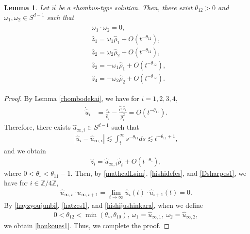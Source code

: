 \documentclass[reqno]{amsart}
\theoremstyle{plain}
\newtheorem{lemma}[theorem]{Lemma}
\theoremstyle{definition}
\numberwithin{equation}{section}
\begin{document}
\begin{lemma}\label{houkourhombus}
Let $\vec{u}$ be a rhombus-type solution. Then, there exist $\theta_{12}>0$ and  $\omega_1,\omega_2\in S^{d-1}$ such that 
\begin{align}\label{houkoues1}
\begin{aligned}
&\omega_1\cdot \omega_2=0,
\\
&\hat{z}_1=\omega_1\hat{\rho}_1+O\left(t^{-\theta_{12}}\right),
\\
&\hat{z}_2=\omega_2\hat{\rho}_2+O\left(t^{-\theta_{12}}\right),
\\
&\hat{z}_3=-\omega_1\hat{\rho}_1+O\left(t^{-\theta_{12}}\right),
\\
&\hat{z}_4=-\omega_2\hat{\rho}_2+O\left(t^{-\theta_{12}}\right).
\end{aligned}
\end{align}
\end{lemma}


\begin{proof}
By Lemma \ref{rhombodekai}, we have for $i=1,2,3,4$,
\begin{align*}
\dot{\hat{u}}_i&=\frac{\dot{\hat{z}}_i}{\hat{\rho}_i}-\frac{\dot{\hat{\rho}}_i\hat{z}_i}{\hat{\rho}_i^2}=O\left(t^{-\theta_{11}}\right).
\end{align*}
Therefore, there exists $\hat{u}_{\infty,i}\in S^{d-1}$ such that
\begin{align*}
\left|\hat{u}_i-\hat{u}_{\infty,i}\right|\lesssim  \int_t^{\infty}s^{-\theta_{11}}ds\lesssim t^{-\theta_{11}+1},
\end{align*}
and we obtain
\begin{align}\label{hatzes1}
\hat{z}_i=\hat{u}_{\infty,i}\hat{\rho}_i+O\left(t^{-\theta_{\circ}}\right),
\end{align}
where $0<\theta_{\circ}<\theta_{11}-1$. Then, by \eqref{mathcalLsim}, \eqref{hishidefes}, and \eqref{Dsharpes1}, we have for $i\in\mathbb{Z}/4\mathbb{Z}$, 
\begin{align}\label{hishijushinkara}
\hat{u}_{\infty,i}\cdot \hat{u}_{\infty,i+1}=\lim_{t\to\infty} \hat{u}_i(t)\cdot \hat{u}_{i+1}(t)=0.
\end{align}
By \eqref{hayzyoujunbi}, \eqref{hatzes1}, and \eqref{hishijushinkara}, when we define
\begin{align*}
0<\theta_{12}<\min{(\theta_{\circ},\theta_{10})},\ \omega_1=\hat{u}_{\infty,1},\ \omega_2=\hat{u}_{\infty,2},
\end{align*}
we obtain \eqref{houkoues1}. Thus, we complete the proof.
\end{proof}
\end{document}
